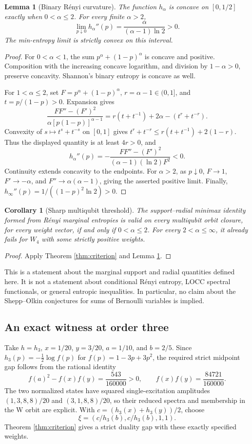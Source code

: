 \documentclass[11pt,a4paper]{article}
\newtheorem{lemma}[theorem]{Lemma}
\newtheorem{corollary}[theorem]{Corollary}
\begin{document}
\begin{lemma}[Binary R\'enyi curvature]\label{lem:renyi}
The function \(h_\alpha\) is concave on \([0,1/2]\) exactly when
\(0<\alpha\le2\). For every finite \(\alpha>2\),
\[
 \lim_{p\downarrow0}h_\alpha''(p)
 =\frac{\alpha}{(\alpha-1)\ln2}>0.
\]
The min-entropy limit is strictly convex on this interval.
\end{lemma}
\begin{proof}
For \(0<\alpha<1\), the sum \(p^\alpha+(1-p)^\alpha\) is concave
and positive. Composition with the increasing concave logarithm,
and division by \(1-\alpha>0\), preserve concavity. Shannon's
binary entropy is concave as well.

For \(1<\alpha\le2\), set \(F=p^\alpha+(1-p)^\alpha\),
\(r=\alpha-1\in(0,1]\), and \(t=p/(1-p)>0\). Expansion gives
\[
 \frac{FF''-(F')^2}{\alpha[p(1-p)]^{\alpha-1}}
 =r(t+t^{-1})+2\alpha-(t^r+t^{-r}).
\]
Convexity of \(s\mapsto t^s+t^{-s}\) on \([0,1]\) gives
\(t^r+t^{-r}\le r(t+t^{-1})+2(1-r)\).
Thus the displayed quantity is at least \(4r>0\), and
\[
 h_\alpha''(p)
 =-\frac{FF''-(F')^2}{(\alpha-1)(\ln2)F^2}<0.
\]
Continuity extends concavity to the endpoints. For \(\alpha>2\),
as \(p\downarrow0\), \(F\to1\), \(F'\to-\alpha\), and
\(F''\to\alpha(\alpha-1)\), giving the asserted positive limit.
Finally, \(h_\infty''(p)=1/((1-p)^2\ln2)>0\).
\end{proof}

\begin{corollary}[Sharp multiqubit threshold]\label{cor:threshold}
The support--radial minimax identity formed from R\'enyi marginal
entropies is valid on every multiqubit orbit closure, for every weight
vector, if and only if \(0<\alpha\le2\).
For every \(2<\alpha\le\infty\), it already fails for \(W_4\)
with some strictly positive weights.
\end{corollary}
\begin{proof}
Apply Theorem \ref{thm:criterion} and Lemma \ref{lem:renyi}.
\end{proof}

This is a statement about the marginal support and radial quantities
defined here. It is not a statement about conditional R\'enyi entropy,
LOCC spectral functionals, or general entropic inequalities.
In particular, no claim about the Shepp--Olkin conjectures for sums
of Bernoulli variables is implied.

\subsection{An exact witness at order three}\label{sec:order-three}
Take \(h=h_3\), \(x=1/20\), \(y=3/20\), \(a=1/10\),
and \(b=2/5\). Since \(h_3(p)=-\tfrac12\log f(p)\) for
\(f(p)=1-3p+3p^2\), the required strict midpoint gap follows from
the rational identity
\[
 f(a)^2-f(x)f(y)=\frac{543}{160000}>0,
 \qquad f(x)f(y)=\frac{84721}{160000}.
\]
The two normalized states have squared single-excitation amplitudes
\((1,3,8,8)/20\) and \((3,1,8,8)/20\), so their reduced spectra
and membership in the W orbit are explicit. With
\(c=(h_3(x)+h_3(y))/2\), choose
\[
 \xi=(c/h_3(b),c/h_3(b),1,1).
\]
Theorem \ref{thm:criterion} gives a strict duality gap with these
exactly specified weights.
\end{document}
